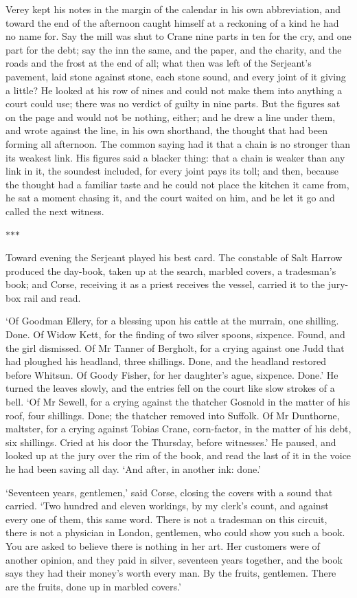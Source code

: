 \documentclass[11pt]{article}
\newcommand{\scenebreak}{%
  \par\vspace{1.1\baselineskip}%
  {\centering $\ast$\quad$\ast$\quad$\ast$\par}%
  \vspace{1.1\baselineskip}\noindent}
\begin{document}
Verey kept his notes in the margin of the calendar in his own abbreviation, and toward the end of the afternoon caught himself at a reckoning of a kind he had no name for. Say the mill was shut to Crane nine parts in ten for the cry, and one part for the debt; say the inn the same, and the paper, and the charity, and the roads and the frost at the end of all; what then was left of the Serjeant's pavement, laid stone against stone, each stone sound, and every joint of it giving a little? He looked at his row of nines and could not make them into anything a court could use; there was no verdict of guilty in nine parts. But the figures sat on the page and would not be nothing, either; and he drew a line under them, and wrote against the line, in his own shorthand, the thought that had been forming all afternoon. The common saying had it that a chain is no stronger than its weakest link. His figures said a blacker thing: that a chain is weaker than any link in it, the soundest included, for every joint pays its toll; and then, because the thought had a familiar taste and he could not place the kitchen it came from, he sat a moment chasing it, and the court waited on him, and he let it go and called the next witness.

\scenebreak
\noindent Toward evening the Serjeant played his best card. The constable of Salt Harrow produced the day-book, taken up at the search, marbled covers, a tradesman's book; and Corse, receiving it as a priest receives the vessel, carried it to the jury-box rail and read.

`Of Goodman Ellery, for a blessing upon his cattle at the murrain, one shilling. Done. Of Widow Kett, for the finding of two silver spoons, sixpence. Found, and the girl dismissed. Of Mr Tanner of Bergholt, for a crying against one Judd that had ploughed his headland, three shillings. Done, and the headland restored before Whitsun. Of Goody Fisher, for her daughter's ague, sixpence. Done.' He turned the leaves slowly, and the entries fell on the court like slow strokes of a bell. `Of Mr Sewell, for a crying against the thatcher Gosnold in the matter of his roof, four shillings. Done; the thatcher removed into Suffolk. Of Mr Dunthorne, maltster, for a crying against Tobias Crane, corn-factor, in the matter of his debt, six shillings. Cried at his door the Thursday, before witnesses.' He paused, and looked up at the jury over the rim of the book, and read the last of it in the voice he had been saving all day. `And after, in another ink: done.'

`Seventeen years, gentlemen,' said Corse, closing the covers with a sound that carried. `Two hundred and eleven workings, by my clerk's count, and against every one of them, this same word. There is not a tradesman on this circuit, there is not a physician in London, gentlemen, who could show you such a book. You are asked to believe there is nothing in her art. Her customers were of another opinion, and they paid in silver, seventeen years together, and the book says they had their money's worth every man. By the fruits, gentlemen. There are the fruits, done up in marbled covers.'
\end{document}
